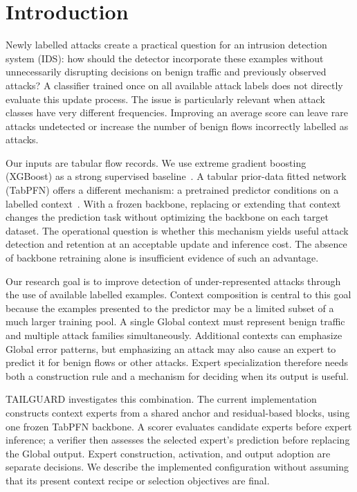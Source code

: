 \documentclass[sigconf,anonymous,pbalance]{acmart}
\begin{document}
\section{Introduction}
\label{sec:intro}
Newly labelled attacks create a practical question for an intrusion detection system (IDS): how should the detector incorporate these examples without unnecessarily disrupting decisions on benign traffic and previously observed attacks? A classifier trained once on all available attack labels does not directly evaluate this update process. The issue is particularly relevant when attack classes have very different frequencies. Improving an average score can leave rare attacks undetected or increase the number of benign flows incorrectly labelled as attacks.

Our inputs are tabular flow records. We use extreme gradient boosting (XGBoost) as a strong supervised baseline~\cite{chen2016xgboost}. A tabular prior-data fitted network (TabPFN) offers a different mechanism: a pretrained predictor conditions on a labelled context~\cite{hollmann2023tabpfn,hollmann2025tabpfn}. With a frozen backbone, replacing or extending that context changes the prediction task without optimizing the backbone on each target dataset. The operational question is whether this mechanism yields useful attack detection and retention at an acceptable update and inference cost. The absence of backbone retraining alone is insufficient evidence of such an advantage.

Our research goal is to improve detection of under-represented attacks through the use of available labelled examples. Context composition is central to this goal because the examples presented to the predictor may be a limited subset of a much larger training pool. A single Global context must represent benign traffic and multiple attack families simultaneously. Additional contexts can emphasize Global error patterns, but emphasizing an attack may also cause an expert to predict it for benign flows or other attacks. Expert specialization therefore needs both a construction rule and a mechanism for deciding when its output is useful.

TAILGUARD investigates this combination. The current implementation constructs context experts from a shared anchor and residual-based blocks, using one frozen TabPFN backbone. A scorer evaluates candidate experts before expert inference; a verifier then assesses the selected expert's prediction before replacing the Global output. Expert construction, activation, and output adoption are separate decisions. We describe the implemented configuration without assuming that its present context recipe or selection objectives are final.
\end{document}
